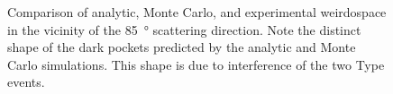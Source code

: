 \begin{figure}
  \caption{Comparison of analytic, Monte Carlo, and experimental weirdospace
    in the vicinity of the \SI{85}{\degree} scattering direction.  Note the
    distinct shape of the dark pockets predicted by the analytic and Monte
    Carlo simulations.  This shape is due to interference of the two Type
     events.}
  \label{fig:scat85degree}
\end{figure}

\begin{figure}
  \centering
  \\
  \\

\end{figure}
